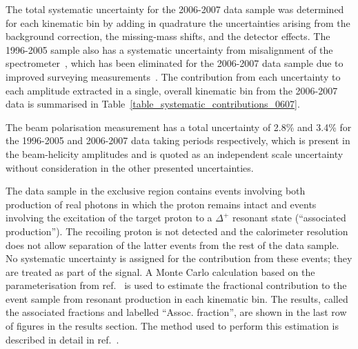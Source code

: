 The total systematic uncertainty for the 2006-2007 data sample was
determined for each kinematic bin by adding in quadrature the
  uncertainties arising from the background correction, the
  missing-mass shifts, and the detector effects.  The 1996-2005 sample also has a
systematic uncertainty from misalignment of the
spectrometer~\cite{Air09}, which has been eliminated for the 2006-2007 data sample due to improved
  surveying measurements~\cite{Bur10}. The contribution from
each uncertainty to each amplitude extracted in a single, overall kinematic bin
from the 2006-2007 data  is summarised in Table~\ref{table_systematic_contributions_0607}.

The beam polarisation measurement has a total uncertainty of 2.8\% and 3.4\% for the 1996-2005 and 2006-2007 data taking periods respectively,
which is present in the beam-helicity amplitudes and is quoted as an
independent scale uncertainty without consideration in the other presented uncertainties.

The data sample in the exclusive region contains events involving both
production of real photons in which the proton remains intact and
events involving the excitation of the target proton to a $\Delta^+$
resonant state (``associated production''). The recoiling proton is not detected and
  the calorimeter resolution does not allow separation of the latter events from the rest of the data sample.
No systematic uncertainty is assigned for the contribution from these
events; they are treated as part of the signal. A Monte Carlo
calculation based on the parameterisation from ref.~\cite{Bra76} is
used to estimate the fractional contribution to the event sample from resonant
production in each kinematic bin. The results, called the associated fractions and labelled ``Assoc. fraction'', are shown in the last row of figures in the results section. The method used to perform this estimation is described in detail in
ref.~\cite{Air08}.

